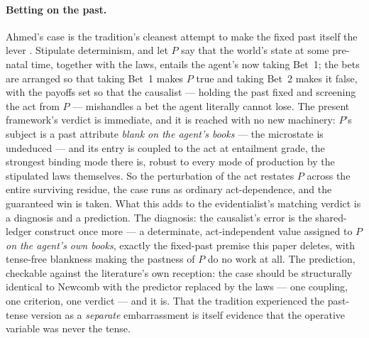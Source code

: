 \paragraph{Betting on the past.} Ahmed's case is the tradition's cleanest attempt to make the fixed past itself the lever \cite{ahmed2014evidence}. Stipulate determinism, and let $P$ say that the world's state at some pre-natal time, together with the laws, entails the agent's now taking Bet~1; the bets are arranged so that taking Bet~1 makes $P$ true and taking Bet~2 makes it false, with the payoffs set so that the causalist --- holding the past fixed and screening the act from $P$ --- mishandles a bet the agent literally cannot lose. The present framework's verdict is immediate, and it is reached with no new machinery: $P$'s subject is a past attribute \emph{blank on the agent's books} --- the microstate is undeduced --- and its entry is coupled to the act at entailment grade, the strongest binding mode there is, robust to every mode of production by the stipulated laws themselves. So the perturbation of the act restates $P$ across the entire surviving residue, the case runs as ordinary act-dependence, and the guaranteed win is taken. What this adds to the evidentialist's matching verdict is a diagnosis and a prediction. The diagnosis: the causalist's error is the shared-ledger construct once more --- a determinate, act-independent value assigned to $P$ \emph{on the agent's own books}, exactly the fixed-past premise this paper deletes, with tense-free blankness making the pastness of $P$ do no work at all. The prediction, checkable against the literature's own reception: the case should be structurally identical to Newcomb with the predictor replaced by the laws --- one coupling, one criterion, one verdict --- and it is. That the tradition experienced the past-tense version as a \emph{separate} embarrassment is itself evidence that the operative variable was never the tense.

